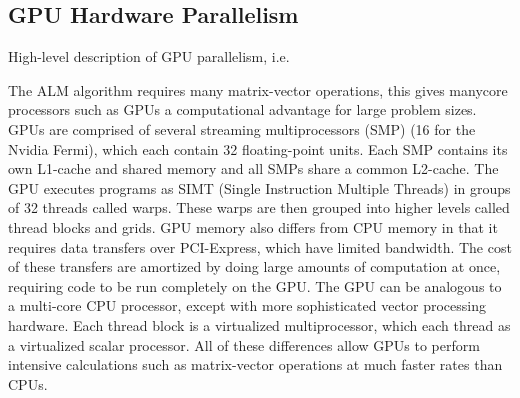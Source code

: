 \documentclass[10pt,twocolumn,letterpaper]{article}
\begin{document}
\subsection{GPU Hardware Parallelism}
High-level description of GPU parallelism, i.e.

The ALM algorithm requires many matrix-vector operations, this gives manycore processors such as GPUs a computational advantage for large problem sizes.  
GPUs are comprised of several streaming multiprocessors (SMP) (16 for the Nvidia Fermi), which each contain 32 floating-point units.  Each SMP contains its own L1-cache and shared memory and all SMPs share a common L2-cache.  The GPU executes programs as SIMT (Single Instruction Multiple Threads) in groups of 32 threads called warps.  These warps are then grouped into higher levels called thread blocks and grids.
GPU memory also differs from CPU memory in that it requires data transfers over PCI-Express, which have limited bandwidth.  The cost of these transfers are amortized by doing large amounts of computation at once, requiring code to be run completely on the GPU.  The GPU can be analogous to a multi-core CPU processor, except with more sophisticated vector processing hardware.  Each thread block is a virtualized multiprocessor, which each thread as a virtualized scalar processor.  All of these differences allow GPUs to perform intensive calculations such as matrix-vector operations at much faster rates than CPUs. 



\end{document}
